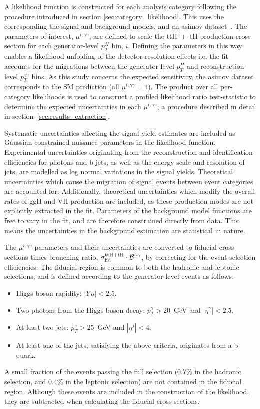 A likelihood function is constructed for each analysis category following the procedure introduced in section \ref{sec:category_likelihood}. This uses the corresponding the signal and background models, and an asimov dataset~\cite{Cowan:2010js}. The parameters of interest, $\mu^{i,\gamma\gamma}$, are defined to scale the ttH~+~tH production cross section for each generator-level $p_T^H$ bin, $i$. Defining the parameters in this way enables a likelihood unfolding of the detector resolution effects i.e. the fit accounts for the migrations between the generator-level $p_T^H$ and reconstruction-level $p_T^{\gamma\gamma}$ bins. As this study concerns the expected sensitivity, the asimov dataset corresponds to the SM prediction (all $\mu^{i,\gamma\gamma}=1$). The product over all per-category likelihoods is used to construct a profiled likelihood ratio test-statistic to determine the expected uncertainties in each $\mu^{i,\gamma\gamma}$; a procedure described in detail in section~\ref{sec:results_extraction}.

Systematic uncertainties affecting the signal yield estimates are included as Gaussian constrained nuisance parameters in the likelihood function. Experimental uncertainties originating from the reconstruction and identification efficiencies for photons and b jets, as well as the energy scale and resolution of jets, are modelled as log normal variations in the signal yields. Theoretical uncertainties which cause the migration of signal events between event categories are accounted for. Additionally, theoretical uncertainties which modify the overall rates of ggH and VH production are included, as these production modes are not explicitly extracted in the fit. Parameters of the background model functions are free to vary in the fit, and are therefore constrained directly from data. This means the uncertainties in the background estimation are statistical in nature.

The $\mu^{i,\gamma\gamma}$ parameters and their uncertainties are converted to fiducial cross sections times branching ratio, $\sigma^{\rm{ttH+tH}}_{\rm{fid}}\cdot\mathcal{B}^{\gamma\gamma}$, by correcting for the event selection efficiencies. The fiducial region is common to both the hadronic and leptonic selections, and is defined according to the generator-level events as follows:
\begin{itemize}
    \item Higgs boson rapidity: $|Y_H|<2.5$.
    \item Two photons from the Higgs boson decay: $p_T^\gamma > 20$~GeV and $|\eta^\gamma|<2.5$.
    \item At least two jets: $p_T^\gamma > 25$~GeV and $|\eta^j|<4$.
    \item At least one of the jets, satisfying the above criteria, originates from a b quark.
\end{itemize}
\noindent
A small fraction of the events passing the full selection (0.7\% in the hadronic selection, and 0.4\% in the leptonic selection) are not contained in the fiducial region. Although these events are included in the construction of the likelihood, they are subtracted when calculating the fiducial cross sections.

